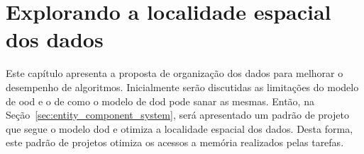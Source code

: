 \chapter{Explorando a localidade espacial dos dados}
\label{cap:tecnica_proposta}

Este capítulo apresenta a proposta de organização dos dados para melhorar o desempenho de algoritmos.
Inicialmente serão discutidas as limitações do modelo de \ac{ood} e o de como o modelo de \ac{dod} pode sanar as mesmas.
Então, na Seção~\ref{sec:entity_component_system}, será apresentado um padrão de projeto que segue o modelo \ac{dod} e otimiza a localidade espacial dos dados.
Desta forma, este padrão de projetos otimiza os acessos a memória realizados pelas tarefas.




